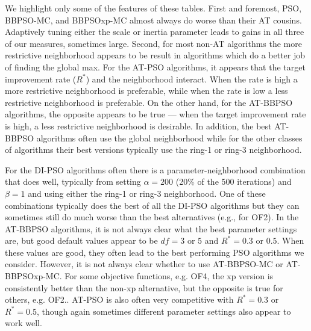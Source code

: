 \documentclass[12pt]{article}
\begin{document}
We highlight only some of the features of these tables. First and foremost, PSO, BBPSO-MC, and BBPSOxp-MC almost always do worse than their AT cousins. Adaptively tuning either the scale or inertia parameter leads to gains in all three of our measures, sometimes large. Second, for most non-AT algorithms the more restrictive neighborhood appears to be result in algorithms which do a better job of finding the global max. For the AT-PSO algorithms, it appears that the target improvement rate ($R^*$) and the neighborhood interact. When the rate is high a more restrictive neighborhood is preferable, while when the rate is low a less restrictive neighborhood is preferable. On the other hand, for the AT-BBPSO algorithms, the opposite appears to be true --- when the target improvement rate is high, a less restrictive neighborhood is desirable. In addition, the best AT-BBPSO algorithms often use the global neighborhood while for the other classes of algorithms their best versions typically use the ring-1 or ring-3 neighborhood.

For the DI-PSO algorithms often there is a parameter-neighborhood combination that does well, typically from setting $\alpha=200$ (20\% of the 500 iterations) and $\beta=1$ and using either the ring-1 or ring-3 neighborhood. One of these combinations typically does the best of all the DI-PSO algorithms but they can sometimes still do much worse than the best alternatives (e.g., for OF2). In the AT-BBPSO algorithms, it is not always clear what the best parameter settings are, but good default values appear to be $df=3$ or $5$ and $R^*=0.3$ or $0.5$. When these values are good, they often lead to the best performing PSO algorithms we consider. However, it is not always clear whether to use AT-BBPSO-MC or AT-BBPSOxp-MC. For some objective functions, e.g. OF4, the xp version is consistently better than the non-xp alternative, but the opposite is true for others, e.g. OF2.. AT-PSO is also often very competitive with $R^*=0.3$ or $R^*=0.5$, though again sometimes different parameter settings also appear to work well. 
\end{document}

